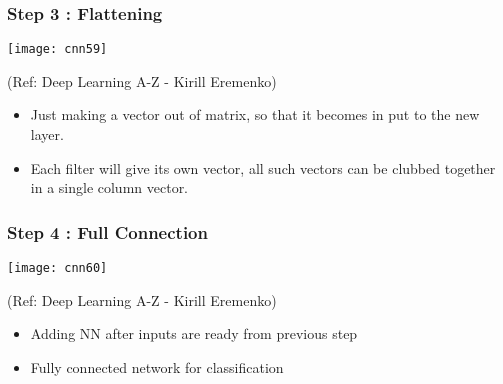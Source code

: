 






\begin{frame}[fragile] \frametitle{Step 3 : Flattening}

\begin{center}
\texttt{[image: cnn59]}

\tiny{(Ref: Deep Learning A-Z - Kirill Eremenko)}
\end{center}

\begin{itemize}
\item Just making a vector out of matrix, so that it becomes in put to the new layer.
\item Each filter will give its own vector, all such vectors can be clubbed together in a single column vector.
\end{itemize}

\end{frame}

\begin{frame}[fragile] \frametitle{Step 4 : Full Connection}

\begin{center}
\texttt{[image: cnn60]}

\tiny{(Ref: Deep Learning A-Z - Kirill Eremenko)}
\end{center}

\begin{itemize}
\item Adding NN after inputs are ready from previous step
\item Fully connected network for classification
\end{itemize}

\end{frame}

